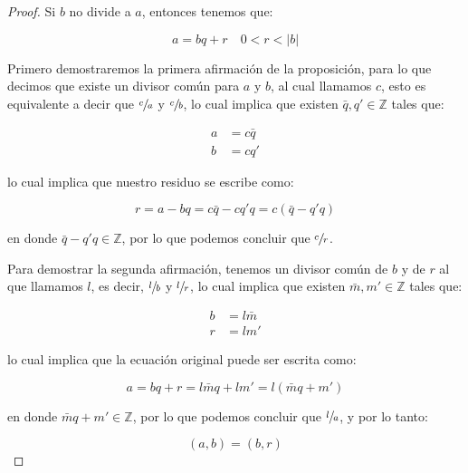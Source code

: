         \begin{proof}
            Si $b$ no divide a $a$, entonces tenemos que:

            \begin{equation*}
                a = bq + r \quad 0 < r < |b|
            \end{equation*}

            Primero demostraremos la primera afirmación de la proposición, para lo que decimos que existe un divisor común para $a$ y $b$, al cual llamamos $c$, esto es equivalente a decir que $\sfrac{c}{a}$ y $\sfrac{c}{b}$, lo cual implica que existen $\bar{q}, q' \in \mathbb{Z}$ tales que:

            \begin{align*}
                a &= c \bar{q} \\
                b &= c q'
            \end{align*}

            lo cual implica que nuestro residuo se escribe como:

            \begin{equation*}
                r = a - bq = c \bar{q} - c q' q = c (\bar{q} - q' q)
            \end{equation*}

            en donde $\bar{q} - q' q \in \mathbb{Z}$, por lo que podemos concluir que $\sfrac{c}{r}$.

            Para demostrar la segunda afirmación, tenemos un divisor común de $b$ y de $r$ al que llamamos $l$, es decir, $\sfrac{l}{b}$ y $\sfrac{l}{r}$, lo cual implica que existen $\bar{m}, m' \in \mathbb{Z}$ tales que:

            \begin{align*}
                b &= l \bar{m} \\
                r &= l m'
            \end{align*}

            lo cual implica que la ecuación original puede ser escrita como:

            \begin{equation*}
                a = bq + r = l \bar{m} q + lm' = l (\bar{m}q  + m')
            \end{equation*}

            en donde $\bar{m}q  + m' \in \mathbb{Z}$, por lo que podemos concluir que $\sfrac{l}{a}$, y por lo tanto:

            \begin{equation*}
                (a, b) = (b, r)
            \end{equation*}
        \end{proof}

